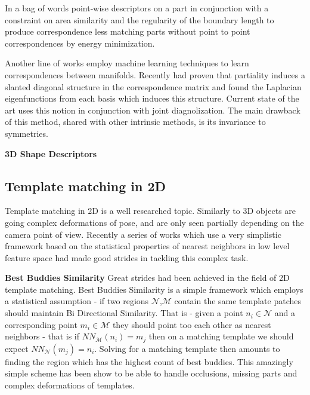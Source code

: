 \documentclass[10pt,twocolumn,letterpaper]{article}
\begin{document}
In\cite{pokrass2013partial} a bag of words point-wise descriptors on a part in conjunction with a constraint on area similarity and the regularity of the boundary length to produce correspondence less matching parts without point to point correspondences by energy minimization.

Another line of works employ machine learning techniques to learn correspondences between manifolds. 
Recently \cite{rodola2017partial} had proven that partiality induces a slanted diagonal structure in the correspondence matrix and found the Laplacian eigenfunctions from each basis which induces this structure. Current state of the art\cite{litany2017fully} uses this notion in conjunction with joint diagnolization. The main drawback of this method, shared with other intrinsic methods, is its invariance to symmetries. 

\textbf{3D Shape Descriptors} 


\subsection{Template matching in 2D}
Template matching in 2D is a well researched topic. Similarly to 3D objects are going complex deformations of pose, and are only seen partially depending on the camera point of view. Recently a series of works which use a very simplistic framework based on the statistical properties of nearest neighbors in low level feature space had made good strides in tackling this complex task.

\textbf{Best Buddies Similarity}
Great strides had been achieved in the field of 2D template matching. Best Buddies Similarity\cite{dekel2015best} is a simple framework which employs a statistical assumption - if two regions $\mathcal{N}$,$\mathcal{M}$ contain the same template patches should maintain Bi Directional Similarity. 
That is - given a point $n_i\in\mathcal{N}$ and a corresponding point $m_i\in\mathcal{M}$ they should point too each other as nearest neighbors - that is if $NN_{\mathcal{M}}(n_i)=m_j$ then on a matching template we should expect $NN_{\mathcal{N}}(m_j)=n_i$. Solving for a matching template then amounts to finding the region which has the highest count of best buddies. This amazingly simple scheme has been show to be able to handle occlusions, missing parts and complex deformations of templates.
\end{document}
